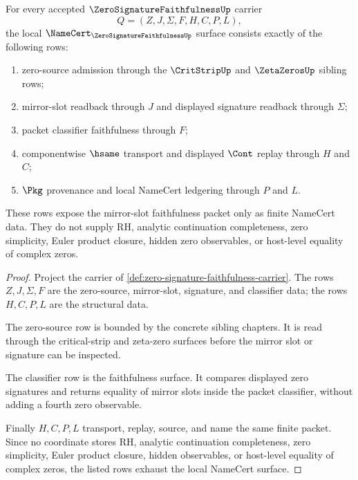 \begin{theorem}
\label{thm:zero-signature-faithfulness-namecert-obligations}
For every accepted $\ZeroSignatureFaithfulnessUp$ carrier
$$
Q=(Z,J,\Sigma,F,H,C,P,L),
$$
the local $\NameCert_{\ZeroSignatureFaithfulnessUp}$ surface consists exactly of the following rows:
\begin{enumerate}
\item zero-source admission through the $\CritStripUp$ and $\ZetaZerosUp$ sibling rows;
\item mirror-slot readback through $J$ and displayed signature readback through $\Sigma$;
\item packet classifier faithfulness through $F$;
\item componentwise $\hsame$ transport and displayed $\Cont$ replay through $H$ and $C$;
\item $\Pkg$ provenance and local NameCert ledgering through $P$ and $L$.
\end{enumerate}
These rows expose the mirror-slot faithfulness packet only as finite NameCert data. They do not supply RH, analytic continuation completeness, zero simplicity, Euler product closure, hidden zero observables, or host-level equality of complex zeros.
\end{theorem}
\begin{proof}
Project the carrier of \autoref{def:zero-signature-faithfulness-carrier}. The rows $Z,J,\Sigma,F$ are the zero-source, mirror-slot, signature, and classifier data; the rows $H,C,P,L$ are the structural data.

The zero-source row is bounded by the concrete sibling chapters. It is read through the critical-strip and zeta-zero surfaces before the mirror slot or signature can be inspected.

The classifier row is the faithfulness surface. It compares displayed zero signatures and returns equality of mirror slots inside the packet classifier, without adding a fourth zero observable.

Finally $H,C,P,L$ transport, replay, source, and name the same finite packet. Since no coordinate stores RH, analytic continuation completeness, zero simplicity, Euler product closure, hidden observables, or host-level equality of complex zeros, the listed rows exhaust the local NameCert surface.
\end{proof}

